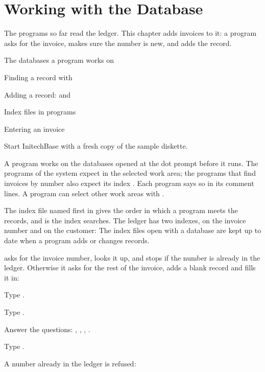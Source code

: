 \chapter{Working with the Database}
The programs so far read the ledger.  This chapter adds invoices to it: a
program asks for the invoice, makes sure the number is new, and adds the
record.

\begin{ChapterCovers}
\item The databases a program works on
\item Finding a record with 
\item Adding a record:  and 
\item Index files in programs
\item Entering an invoice
\end{ChapterCovers}

Start InitechBase with a fresh copy of the sample diskette.

A program works on the databases opened at the dot prompt before it runs.  The
programs of the system expect  in the selected work area; the
programs that find invoices by number also expect its index .
Each program says so in its comment lines.  A program can select other work
areas with .

The index file named first in  gives the order in which a program
meets the records, and is the index  searches.  The ledger has two
indexes, on the invoice number and on the customer:
The index files open with a database are kept up to date when a program adds
or changes records.

 asks for the invoice number, looks it up, and stops if the
number is already in the ledger.  Otherwise it asks for the rest of the invoice,
adds a blank record and fills it in:
\begin{Steps}
\item Type .
\item Type .
\item Answer the questions: , , ,
.
\item Type .
\end{Steps}
A number already in the ledger is refused:

